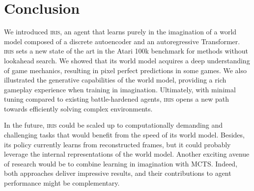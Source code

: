 \section{Conclusion}

We introduced \textsc{iris}, an agent that learns purely in the imagination of a world model composed of a discrete autoencoder and an autoregressive Transformer. \textsc{iris} sets a new state of the art in the Atari 100k benchmark for methods without lookahead search. We showed that its world model acquires a deep understanding of game mechanics, resulting in pixel perfect predictions in some games. We also illustrated the generative capabilities of the world model, providing a rich gameplay experience when training in imagination. Ultimately, with minimal tuning compared to existing battle-hardened agents, \textsc{iris} opens a new path towards efficiently solving complex environments.

In the future, \textsc{iris} could be scaled up to computationally demanding and challenging tasks that would benefit from the speed of its world model. Besides, its policy currently learns from reconstructed frames, but it could probably leverage the internal representations of the world model. Another exciting avenue of research would be to combine learning in imagination with MCTS. Indeed, both approaches deliver impressive results, and their contributions to agent performance might be complementary.